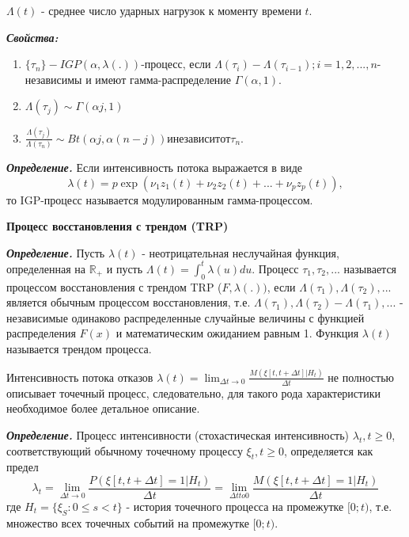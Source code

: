 $\Lambda(t)$ - среднее число ударных нагрузок к моменту времени $t$.

{\bfseries \textit{Свойства:} }
\begin{enumerate}
\item $\{\tau_n\} - IGP(\alpha, \lambda(.))$-процесс, если $\Lambda(\tau_i) - \Lambda(\tau_{i-1}); i = 1,2,...,n $- независимы и имеют гамма-распределение $\Gamma(\alpha, 1).$ 
\item $\Lambda(\tau_j) \sim \Gamma(\alpha j, 1)$
\item $\frac{\Lambda(\tau_j)}{\Lambda(\tau_n)} \sim Bt(\alpha j, \alpha(n - j)) и не зависит от \tau_n.$
\end{enumerate}

{\bfseries \textit{Определение.}} Если интенсивность потока выражается в виде
\begin{equation}
\lambda(t) = p \exp(\nu_1 z_1(t) + \nu_2 z_2(t) + ... + \nu_p z_p(t)),
\end{equation}
то IGP-процесс называется модулированным гамма-процессом.

{\bfseries Процесс восстановления с трендом (TRP)}

{\bfseries \textit{Определение.}} Пусть $\lambda(t)$ - неотрицательная неслучайная функция, определенная на $\mathbb{R}_+$ и пусть $\Lambda(t) = \int_0^t      \lambda(u) d u.$ Процесс $\tau_1, \tau_2, ...$ называется процессом восстановления с трендом TRP ($F, \lambda(.))$, если $\Lambda(\tau_1), \Lambda(\tau_2), ...$ является обычным процессом восстановления, т.е. $\Lambda(\tau_1), \Lambda(\tau_2) - \Lambda(\tau_1), ...$ - независимые одинаково распределенные случайные величины с функцией распределения $F(x)$ и математическим ожиданием равным 1. Функция $\lambda(t)$ называется трендом процесса.

Интенсивность потока отказов $\lambda(t) = \lim_{\Delta t \to 0} \frac{M(\xi[t, t + \Delta t] | H_t)}{\Delta t} $ не полностью описывает точечный процесс, следовательно, для такого рода характеристики необходимое более детальное описание.

{\bfseries \textit{Определение.}} Процесс интенсивности (стохастическая интенсивность) $\lambda_t, t \geqslant 0$, соответствующий обычному точечному процессу $\xi_t, t \geqslant 0$, определяется как предел
\begin{equation}
\lambda_t = \lim_{\Delta t \to 0} \frac{ P(\xi[t, t + \Delta t] = 1 | H_t)}{\Delta t} = \lim_{\Delta t to 0} \frac{ M(\xi[t, t + \Delta t] = 1 | H_t)}{\Delta t} 
\end{equation}
где $H_t = \{\xi_S : 0 \leqslant s < t\}$ - история точечного процесса на промежутке $[0; t)$, т.е. множество всех точечных событий на промежутке $[0; t)$.

